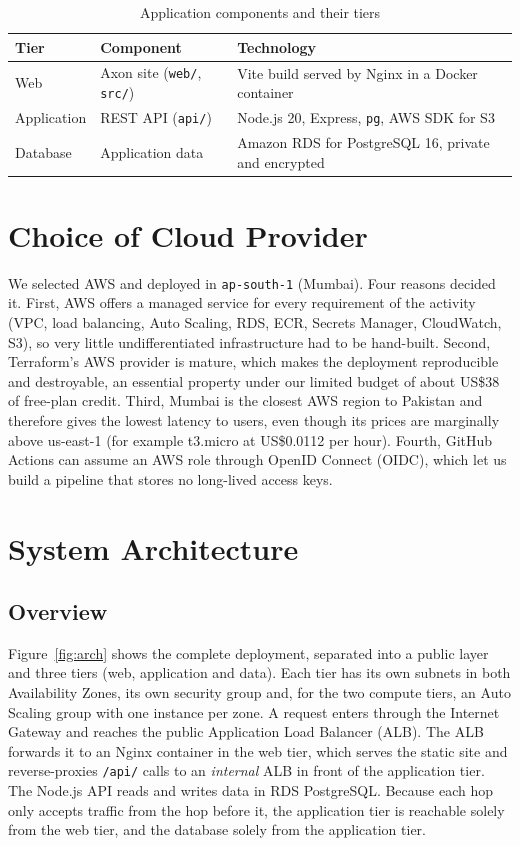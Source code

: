 \documentclass[10pt,a4paper]{article}
\newcommand{\hdr}{\rowcolor{rowblue}}
\begin{document}
\begin{table}[H]
\centering\small
\caption{Application components and their tiers}\label{tab:components}
\begin{tabular}{@{}>{\raggedright}p{2.2cm} p{5.3cm} p{6.2cm}@{}}
\toprule
\hdr Tier & Component & Technology\\
\midrule
Web & Axon site (\texttt{web/}, \texttt{src/}) & Vite build served by Nginx in a Docker container\\
Application & REST API (\texttt{api/}) & Node.js 20, Express, \texttt{pg}, AWS SDK for S3\\
Database & Application data & Amazon RDS for PostgreSQL 16, private and encrypted\\
\bottomrule
\end{tabular}
\end{table}

\section{Choice of Cloud Provider}
We selected AWS and deployed in \texttt{ap-south-1} (Mumbai). Four reasons decided it. First, AWS offers a managed service
for every requirement of the activity (VPC, load balancing, Auto Scaling, RDS, ECR, Secrets Manager, CloudWatch, S3), so very little
undifferentiated infrastructure had to be hand-built. Second, Terraform's AWS provider is mature, which makes the deployment
reproducible and destroyable, an essential property under our limited budget of about US\$38 of free-plan credit. Third, Mumbai is the
closest AWS region to Pakistan and therefore gives the lowest latency to users, even though its prices are marginally above us-east-1
(for example t3.micro at US\$0.0112 per hour). Fourth, GitHub Actions can assume an AWS role through OpenID Connect (OIDC), which let
us build a pipeline that stores no long-lived access keys.

\section{System Architecture}
\subsection{Overview}
Figure~\ref{fig:arch} shows the complete deployment, separated into a public layer and three tiers (web, application and data). Each tier
has its own subnets in both Availability Zones, its own security group and, for the two compute tiers, an Auto Scaling group with one
instance per zone. A request enters through the Internet Gateway and reaches the public Application
Load Balancer (ALB). The ALB forwards it to an Nginx container in the web tier, which serves the static site and reverse-proxies
\texttt{/api/} calls to an \emph{internal} ALB in front of the application tier. The Node.js API reads and writes data in RDS
PostgreSQL. Because each hop only accepts traffic from the hop before it, the application tier is reachable solely from the web tier,
and the database solely from the application tier.
\end{document}
